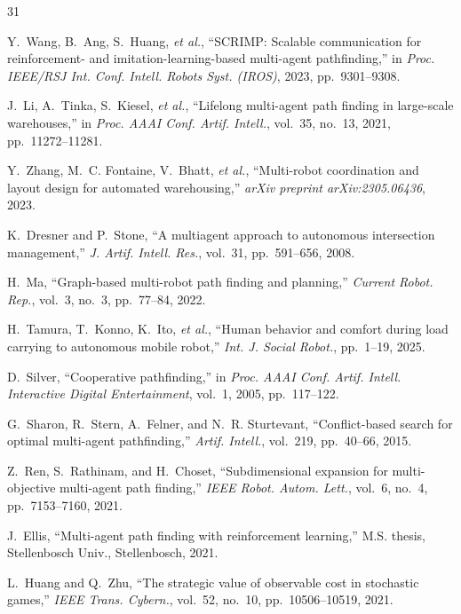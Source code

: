 \documentclass[conference]{IEEEtran}
\newcommand{\etal}{\textit{et al.}}
\begin{document}

{\small
\begin{thebibliography}{31}

Y.~Wang, B.~Ang, S.~Huang, \etal,
``SCRIMP: Scalable communication for reinforcement- and
imitation-learning-based multi-agent pathfinding,''
in \emph{Proc. IEEE/RSJ Int. Conf. Intell. Robots Syst. (IROS)},
2023, pp.~9301--9308.

J.~Li, A.~Tinka, S.~Kiesel, \etal,
``Lifelong multi-agent path finding in large-scale warehouses,''
in \emph{Proc. AAAI Conf. Artif. Intell.}, vol.~35, no.~13,
2021, pp.~11272--11281.

Y.~Zhang, M.~C. Fontaine, V.~Bhatt, \etal,
``Multi-robot coordination and layout design for automated
warehousing,''
\emph{arXiv preprint arXiv:2305.06436}, 2023.

K.~Dresner and P.~Stone,
``A multiagent approach to autonomous intersection management,''
\emph{J. Artif. Intell. Res.}, vol.~31, pp.~591--656, 2008.

H.~Ma,
``Graph-based multi-robot path finding and planning,''
\emph{Current Robot. Rep.}, vol.~3, no.~3, pp.~77--84, 2022.

H.~Tamura, T.~Konno, K.~Ito, \etal,
``Human behavior and comfort during load carrying to autonomous
mobile robot,''
\emph{Int. J. Social Robot.}, pp.~1--19, 2025.

D.~Silver,
``Cooperative pathfinding,''
in \emph{Proc. AAAI Conf. Artif. Intell. Interactive Digital
Entertainment}, vol.~1, 2005, pp.~117--122.

G.~Sharon, R.~Stern, A.~Felner, and N.~R. Sturtevant,
``Conflict-based search for optimal multi-agent pathfinding,''
\emph{Artif. Intell.}, vol.~219, pp.~40--66, 2015.

Z.~Ren, S.~Rathinam, and H.~Choset,
``Subdimensional expansion for multi-objective multi-agent path
finding,''
\emph{IEEE Robot. Autom. Lett.}, vol.~6, no.~4,
pp.~7153--7160, 2021.

J.~Ellis,
``Multi-agent path finding with reinforcement learning,''
M.S. thesis, Stellenbosch Univ., Stellenbosch, 2021.

L.~Huang and Q.~Zhu,
``The strategic value of observable cost in stochastic games,''
\emph{IEEE Trans. Cybern.}, vol.~52, no.~10,
pp.~10506--10519, 2021.


\end{thebibliography}}
\end{document}
